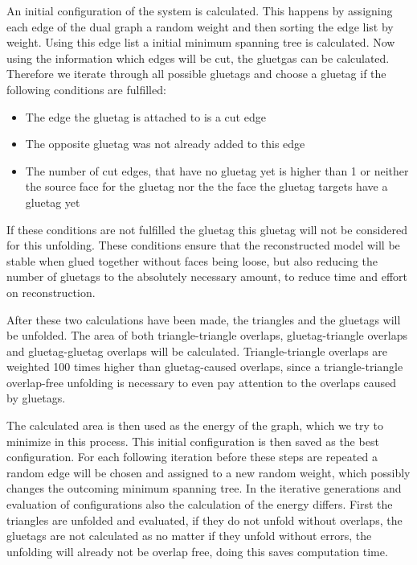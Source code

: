 \documentclass[draft,final]{vutinfth} %
\begin{document}
An initial configuration of the system is calculated. This happens by assigning each edge of the dual graph a random weight and then sorting the edge list by weight. Using this edge list a initial minimum spanning tree is calculated. Now using the information which edges will be cut, the gluetgas can be calculated. Therefore we iterate through all possible gluetags and choose a gluetag if the following conditions are fulfilled:

\begin{itemize}
	\item The edge the gluetag is attached to is a cut edge
	\item The opposite gluetag was not already added to this edge
	\item The number of cut edges, that have no gluetag yet is higher than 1 or neither the source face for the gluetag nor the the face the gluetag targets have a gluetag yet
\end{itemize}

If these conditions are not fulfilled the gluetag this gluetag will not be considered for this unfolding. These conditions ensure that the reconstructed model will be stable when glued together without faces being loose, but also reducing the number of gluetags to the absolutely necessary amount, to reduce time and effort on reconstruction.

After these two calculations have been made, the triangles and the gluetags will be unfolded. The area of both triangle-triangle overlaps, gluetag-triangle overlaps and gluetag-gluetag overlaps will be calculated. Triangle-triangle overlaps are weighted 100 times higher than gluetag-caused overlaps, since a triangle-triangle overlap-free unfolding is necessary to even pay attention to the overlaps caused by gluetags.

The calculated area is then used as the energy of the graph, which we try to minimize in this process. This initial configuration is then saved as the best configuration. For each following iteration before these steps are repeated a random edge will be chosen and assigned to a new random weight, which possibly changes the outcoming minimum spanning tree. In the iterative generations and evaluation of configurations also the calculation of the energy differs. First the triangles are unfolded and evaluated, if they do not unfold without overlaps, the gluetags are not calculated as no matter if they unfold without errors, the unfolding will already not be overlap free, doing this saves computation time.
\end{document}
